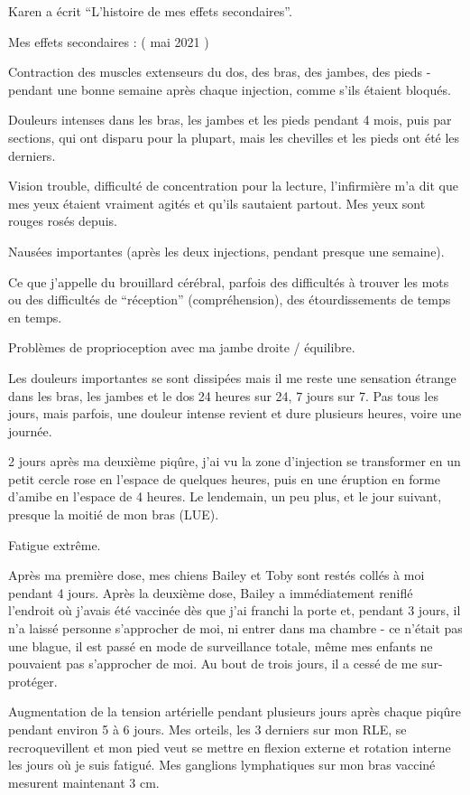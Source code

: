 Karen a écrit “L'histoire de mes effets secondaires”.

Mes effets secondaires : ( mai 2021 )

Contraction des muscles extenseurs du dos, des bras, des jambes, des pieds -
pendant une bonne semaine après chaque injection, comme s'ils étaient bloqués.

Douleurs intenses dans les bras, les jambes et les pieds pendant 4 mois, puis
par sections, qui ont disparu pour la plupart, mais les chevilles et les pieds
ont été les derniers.

Vision trouble, difficulté de concentration pour la lecture, l'infirmière m'a
dit que mes yeux étaient vraiment agités et qu'ils sautaient partout. Mes yeux
sont rouges rosés depuis.

Nausées importantes (après les deux injections, pendant presque une semaine).

Ce que j'appelle du brouillard cérébral, parfois des difficultés à trouver les
mots ou des difficultés de “réception” (compréhension), des étourdissements de
temps en temps.

Problèmes de proprioception avec ma jambe droite / équilibre.

Les douleurs importantes se sont dissipées mais il me reste une sensation
étrange dans les bras, les jambes et le dos 24 heures sur 24, 7 jours sur 7. Pas
tous les jours, mais parfois, une douleur intense revient et dure plusieurs
heures, voire une journée.

2 jours après ma deuxième piqûre, j'ai vu la zone d'injection se transformer en
un petit cercle rose en l'espace de quelques heures, puis en une éruption en
forme d'amibe en l'espace de 4 heures. Le lendemain, un peu plus, et le jour
suivant, presque la moitié de mon bras (LUE).

Fatigue extrême.

Après ma première dose, mes chiens Bailey et Toby sont restés collés à moi
pendant 4 jours. Après la deuxième dose, Bailey a immédiatement reniflé
l'endroit où j'avais été vaccinée dès que j'ai franchi la porte et, pendant 3
jours, il n'a laissé personne s'approcher de moi, ni entrer dans ma chambre - ce
n'était pas une blague, il est passé en mode de surveillance totale, même mes
enfants ne pouvaient pas s'approcher de moi. Au bout de trois jours, il a cessé
de me sur-protéger.

Augmentation de la tension artérielle pendant plusieurs jours après chaque
piqûre pendant environ 5 à 6 jours. Mes orteils, les 3 derniers sur mon RLE, se
recroquevillent et mon pied veut se mettre en flexion externe et rotation
interne les jours où je suis fatigué. Mes ganglions lymphatiques sur mon bras
vacciné mesurent maintenant 3 cm.



